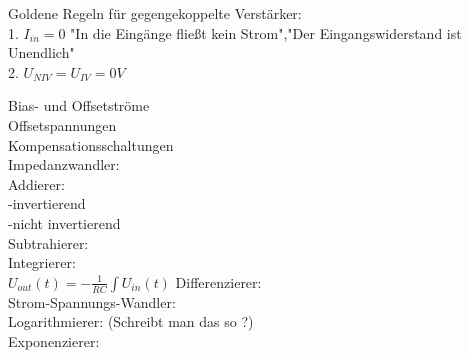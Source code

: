 \documentclass[A4]{scrreprt}
\begin{document}
  Goldene Regeln für gegengekoppelte Verstärker:\\
  1. $I_{in} = 0$ "In die Eingänge fließt kein Strom","Der Eingangswiderstand ist Unendlich"\\
  2. $U_{NIV} = U_{IV} = 0V$ 

  Bias- und Offsetströme\\
  Offsetspannungen\\
  Kompensationsschaltungen\\

  Impedanzwandler:\\
  Addierer:\\
   -invertierend\\
   -nicht invertierend\\
  Subtrahierer:\\
  Integrierer:\\
  $U_{out}(t) = -\frac{1}{RC} \int U_{in}(t)$
  Differenzierer:\\
  Strom-Spannungs-Wandler:\\
  Logarithmierer: (Schreibt man das so ?)\\
  Exponenzierer:\\
  
\end{document}
